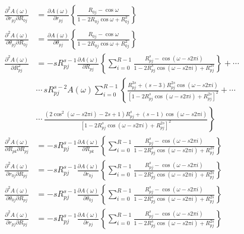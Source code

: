 \documentclass[a4paper,twoside,10pt,english]{report}
\begin{document}
\begin{raggedbottom}
\begin{align*}
\frac{\partial^{2}A\left(\omega\right)}{\partial r_{pj}\partial R_{0j}} &= \frac{\partial A\left(\omega\right)}{\partial r_{pj}}\left\{ \frac{R_{0j}-\cos\omega}{1-2R_{0j}\cos\omega+R_{0j}^{2}}\right\} \\
\frac{\partial^{2}A\left(\omega\right)}{\partial\theta_{pj}\partial R_{0j}} &= \frac{\partial A\left(\omega\right)}{\partial\theta_{pj}}\left\{ \frac{R_{0j}-\cos\omega}{1-2R_{0j}\cos\omega+R_{0j}^{2}}\right\} \\
\frac{\partial^{2}A\left(\omega\right)}{\partial R_{pj}^{2}} &= -sR_{pj}^{s-1}\frac{\partial A\left(\omega\right)}{\partial R_{pj}}\left\{ \sum_{i=0}^{R-1}\frac{R_{pj}^{s}-\cos\left(\omega-s2\pi i\right)}{1-2R_{pj}^{s}\cos\left(\omega-s2\pi i\right)+R_{pj}^{2s}}\right\} +\cdots\\
 & \cdots\, sR_{pj}^{s-2}A\left(\omega\right)\sum_{i=0}^{R-1}\left\{ \frac{R_{pj}^{3s}+\left(s-3\right)R_{pj}^{2s}\cos\left(\omega-s2\pi i\right)}{\left[1-2R_{pj}^{s}\cos\left(\omega-s2\pi i\right)+R_{pj}^{2s}\right]^{2}}\right.+\cdots\\
 & \cdots\,\left.\frac{\left(2\cos^{2}\left(\omega-s2\pi i\right)-2s+1\right)R_{pj}^{s}+\left(s-1\right)\cos\left(\omega-s2\pi i\right)}{\left[1-2R_{pj}^{s}\cos\left(\omega-s2\pi i\right)+R_{pj}^{2s}\right]^{2}}\right\} \\
\frac{\partial^{2}A\left(\omega\right)}{\partial R_{pk}\partial R_{pj}} &= -sR_{pj}^{s-1}\frac{\partial A\left(\omega\right)}{\partial R_{pk}}\left\{ \sum_{i=0}^{R-1}\frac{R_{pj}^{s}-\cos\left(\omega-s2\pi i\right)}{1-2R_{pj}^{s}\cos\left(\omega-s2\pi i\right)+R_{pj}^{2s}}\right\} \\
\frac{\partial^{2}A\left(\omega\right)}{\partial r_{0j}\partial R_{pj}} &= -sR_{pj}^{s-1}\frac{\partial A\left(\omega\right)}{\partial r_{0j}}\left\{ \sum_{i=0}^{R-1}\frac{R_{pj}^{s}-\cos\left(\omega-s2\pi i\right)}{1-2R_{pj}^{s}\cos\left(\omega-s2\pi i\right)+R_{pj}^{2s}}\right\} \\
\frac{\partial^{2}A\left(\omega\right)}{\partial\theta_{0j}\partial R_{pj}} &= -sR_{pj}^{s-1}\frac{\partial A\left(\omega\right)}{\partial\theta_{0j}}\left\{ \sum_{i=0}^{R-1}\frac{R_{pj}^{s}-\cos\left(\omega-s2\pi i\right)}{1-2R_{pj}^{s}\cos\left(\omega-s2\pi i\right)+R_{pj}^{2s}}\right\} \\
\frac{\partial^{2}A\left(\omega\right)}{\partial r_{pj}\partial R_{pj}} &= -sR_{pj}^{s-1}\frac{\partial A\left(\omega\right)}{\partial r_{pj}}\left\{ \sum_{i=0}^{R-1}\frac{R_{pj}^{s}-\cos\left(\omega-s2\pi i\right)}{1-2R_{pj}^{s}\cos\left(\omega-s2\pi i\right)+R_{pj}^{2s}}\right\} \\

\end{align*}
\end{raggedbottom}
\end{document}
